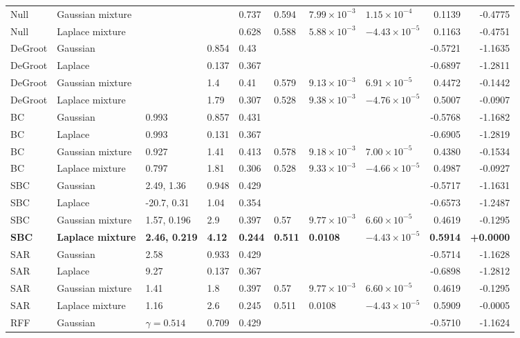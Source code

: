 \begin{longtable}{llllllllrr}
Null & Gaussian mixture &  &  & 0.737 & 0.594 & $7.99\times10^{-3}$ & $1.15\times10^{-4}$ & 0.1139 & -0.4775 \\
Null & Laplace mixture &  &  & 0.628 & 0.588 & $5.88\times10^{-3}$ & $-4.43\times10^{-5}$ & 0.1163 & -0.4751 \\
DeGroot & Gaussian &  & 0.854 & 0.43 &  &  &  & -0.5721 & -1.1635 \\
DeGroot & Laplace &  & 0.137 & 0.367 &  &  &  & -0.6897 & -1.2811 \\
DeGroot & Gaussian mixture &  & 1.4 & 0.41 & 0.579 & $9.13\times10^{-3}$ & $6.91\times10^{-5}$ & 0.4472 & -0.1442 \\
DeGroot & Laplace mixture &  & 1.79 & 0.307 & 0.528 & $9.38\times10^{-3}$ & $-4.76\times10^{-5}$ & 0.5007 & -0.0907 \\
BC & Gaussian & 0.993 & 0.857 & 0.431 &  &  &  & -0.5768 & -1.1682 \\
BC & Laplace & 0.993 & 0.131 & 0.367 &  &  &  & -0.6905 & -1.2819 \\
BC & Gaussian mixture & 0.927 & 1.41 & 0.413 & 0.578 & $9.18\times10^{-3}$ & $7.00\times10^{-5}$ & 0.4380 & -0.1534 \\
BC & Laplace mixture & 0.797 & 1.81 & 0.306 & 0.528 & $9.33\times10^{-3}$ & $-4.66\times10^{-5}$ & 0.4987 & -0.0927 \\
SBC & Gaussian & 2.49, 1.36 & 0.948 & 0.429 &  &  &  & -0.5717 & -1.1631 \\
SBC & Laplace & -20.7, 0.31 & 1.04 & 0.354 &  &  &  & -0.6573 & -1.2487 \\
SBC & Gaussian mixture & 1.57, 0.196 & 2.9 & 0.397 & 0.57 & $9.77\times10^{-3}$ & $6.60\times10^{-5}$ & 0.4619 & -0.1295 \\
\textbf{SBC} & \textbf{Laplace mixture} & \textbf{2.46, 0.219} & \textbf{4.12} & \textbf{0.244} & \textbf{0.511} & \textbf{0.0108} & \textbf{$-4.43\times10^{-5}$} & \textbf{0.5914} & \textbf{+0.0000} \\
SAR & Gaussian & 2.58 & 0.933 & 0.429 &  &  &  & -0.5714 & -1.1628 \\
SAR & Laplace & 9.27 & 0.137 & 0.367 &  &  &  & -0.6898 & -1.2812 \\
SAR & Gaussian mixture & 1.41 & 1.8 & 0.397 & 0.57 & $9.77\times10^{-3}$ & $6.60\times10^{-5}$ & 0.4619 & -0.1295 \\
SAR & Laplace mixture & 1.16 & 2.6 & 0.245 & 0.511 & 0.0108 & $-4.43\times10^{-5}$ & 0.5909 & -0.0005 \\
RFF & Gaussian & $\gamma=0.514$ & 0.709 & 0.429 &  &  &  & -0.5710 & -1.1624 \\

\end{longtable}
